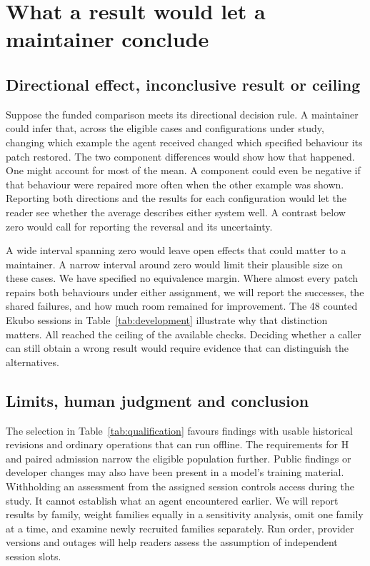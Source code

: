 \section{What a result would let a maintainer conclude}

\label{sec:interpretation}

\subsection{Directional effect, inconclusive result or ceiling}

Suppose the funded comparison meets its directional decision rule. A maintainer could infer that, across the eligible cases and configurations under study, changing which example the agent received changed which specified behaviour its patch restored. The two component differences would show how that happened. One might account for most of the mean. A component could even be negative if that behaviour were repaired more often when the other example was shown. Reporting both directions and the results for each configuration would let the reader see whether the average describes either system well. A contrast below zero would call for reporting the reversal and its uncertainty.

A wide interval spanning zero would leave open effects that could matter to a maintainer. A narrow interval around zero would limit their plausible size on these cases. We have specified no equivalence margin. Where almost every patch repairs both behaviours under either assignment, we will report the successes, the shared failures, and how much room remained for improvement. The 48 counted Ekubo sessions in Table~\ref{tab:development} illustrate why that distinction matters. All reached the ceiling of the available checks. Deciding whether a caller can still obtain a wrong result would require evidence that can distinguish the alternatives.

\subsection{Limits, human judgment and conclusion}

The selection in Table~\ref{tab:qualification} favours findings with usable historical revisions and ordinary operations that can run offline. The requirements for H and paired admission narrow the eligible population further. Public findings or developer changes may also have been present in a model's training material. Withholding an assessment from the assigned session controls access during the study. It cannot establish what an agent encountered earlier. We will report results by family, weight families equally in a sensitivity analysis, omit one family at a time, and examine newly recruited families separately. Run order, provider versions and outages will help readers assess the assumption of independent session slots.

